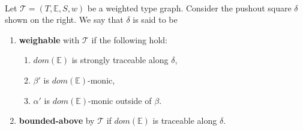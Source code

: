 \begin{definition}
    \label{def:weighable}
    \ \newline
    \noindent
    \begin{minipage}{0.7\textwidth}
        Let  $\mathcal{T} \mathop{=} (T,\mathbb{E}, S, w)$ be a weighted type graph.
        Consider the pushout square $\delta$ shown on the right. We say that $\delta$ is said to be
         \begin{enumerate}[label=(\alph*)]
        \item \textbf{weighable} with $\mathcal{T}$ if the following hold:
            \begin{enumerate}[label=(\roman*)]
                \item $dom(\mathbb{E})$ is strongly traceable along $\delta$,
                \item $\beta'$ is $dom(\mathbb{E})$-monic,
                \item $\alpha'$ is $dom(\mathbb{E})$-monic outside of $\beta$.
            \end{enumerate}
        \item \textbf{bounded-above} by $\mathcal{T}$ if $dom(\mathbb{E})$ is traceable along $\delta$.
    \end{enumerate}
    \end{minipage}
    \begin{minipage}{0.3\textwidth}
        \begin{center}
        \end{center}
    \end{minipage}
   
\end{definition}


